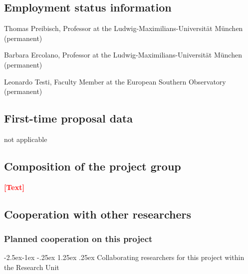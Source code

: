 \documentclass[10pt,fleqn,twoside]{article}
\makeatletter
\newcommand{\todo}[1]{\textcolor{red}{\bf #1}}
\newcommand{\Tcol}{\color{blue}}
\renewcommand\paragraph{\@startsection{paragraph}{4}{\z@}%
            {-2.5ex\@plus -1ex \@minus -.25ex}%
            {1.25ex \@plus .25ex}%
            {\normalfont\normalsize\bfseries}}
\makeatother
\begin{document}
\subsection{\Tcol Employment status information}

Thomas Preibisch, Professor at the Ludwig-Maximilians-Universit\"at M\"unchen  (permanent)

Barbara Ercolano, Professor at the Ludwig-Maximilians-Universit\"at M\"unchen  (permanent)

Leonardo Testi, Faculty Member at the European Southern Observatory  (permanent)

\subsection{\Tcol First-time proposal data}

not applicable
\vspace{-2mm}

\subsection{\Tcol Composition of the project group}

\todo{[Text]}

\subsection{\Tcol Cooperation with other researchers}

\subsubsection{\Tcol Planned cooperation on this project}

\paragraph{\Tcol Collaborating researchers for this project within the
  Research Unit}
\end{document}
